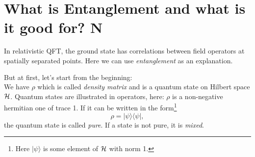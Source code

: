 \section{What is Entanglement and what is it good for? \textbf{N}}
	In relativistic QFT, the ground state has correlations between field operators at spatially separated points. Here we can use \textit{entanglement} as an explanation.
	
	But at first, let's start from the beginning:
	\\
	We have $\rho$ which is called \textit{density matrix} and is a quantum state on Hilbert space $\mathcal{H}$. Quantum states are illustrated in operators, here: $\rho$ is a non-negative hermitian one of trace 1. If it can be written in the form\footnote{Here $|\psi\rangle$ is some element of $\mathcal{H}$ with norm 1.}
		\begin{equation}
			\rho=|\psi\rangle \langle\psi|,
		\end{equation}
	 the quantum state is called \textit{pure}. If a state is not pure, it is \textit{mixed}.
	 
